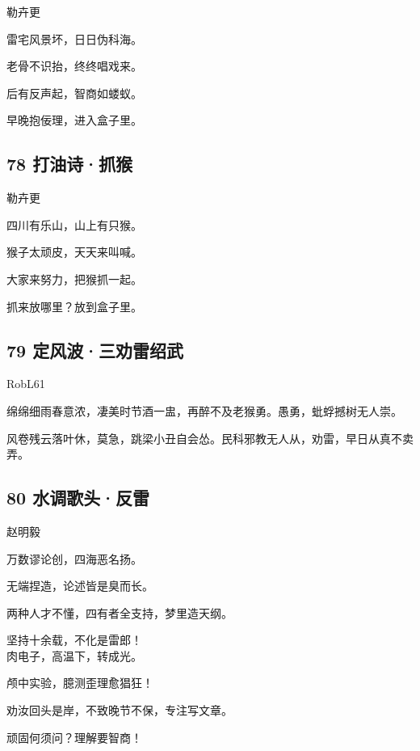 {勒卉更}

雷宅风景坏，日日伪科海。

老骨不识抬，终终唱戏来。

后有反声起，智商如蝼蚁。

早晚抱佞理，进入盒子里。

\hypertarget{ux6253ux6cb9ux8bd7ux6293ux7334}{%
\subsection{78 打油诗·抓猴}\label{ux6253ux6cb9ux8bd7ux6293ux7334}}

{勒卉更}

四川有乐山，山上有只猴。

猴子太顽皮，天天来叫喊。

大家来努力，把猴抓一起。

抓来放哪里？放到盒子里。

\hypertarget{ux5b9aux98ceux6ce2ux4e09ux529dux96f7ux7ecdux6b66}{%
\subsection{79
定风波·三劝雷绍武}\label{ux5b9aux98ceux6ce2ux4e09ux529dux96f7ux7ecdux6b66}}

{RobL61}

绵绵细雨春意浓，凄美时节酒一盅，再醉不及老猴勇。愚勇，蚍蜉撼树无人崇。

风卷残云落叶休，莫急，跳梁小丑自会怂。民科邪教无人从，劝雷，早日从真不卖弄。

\hypertarget{ux6c34ux8c03ux6b4cux5934ux53cdux96f7}{%
\subsection{80
水调歌头·反雷}\label{ux6c34ux8c03ux6b4cux5934ux53cdux96f7}}

{赵明毅}

万数谬论创，四海恶名扬。

无端捏造，论述皆是臭而长。

两种人才不懂，四有者全支持，梦里造天纲。

坚持十余载，不化是雷郎！ ~\\
肉电子，高温下，转成光。

颅中实验，臆测歪理愈猖狂！

劝汝回头是岸，不致晚节不保，专注写文章。

顽固何须问？理解要智商！

~\\


